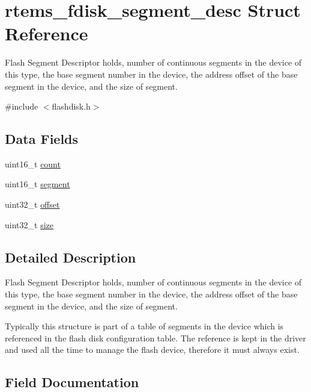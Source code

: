 \hypertarget{structrtems__fdisk__segment__desc}{}\section{rtems\+\_\+fdisk\+\_\+segment\+\_\+desc Struct Reference}
\label{structrtems__fdisk__segment__desc}


Flash Segment Descriptor holds, number of continuous segments in the device of this type, the base segment number in the device, the address offset of the base segment in the device, and the size of segment.  




{\ttfamily \#include $<$flashdisk.\+h$>$}

\subsection*{Data Fields}
\begin{DoxyCompactItemize}
\item 
uint16\+\_\+t \mbox{\hyperlink{structrtems__fdisk__segment__desc_af45cd5d67fcc57e6e44a6767b976b931}{count}}
\item 
uint16\+\_\+t \mbox{\hyperlink{structrtems__fdisk__segment__desc_a69898a46cb1e7b34ab1e11a53e352034}{segment}}
\item 
uint32\+\_\+t \mbox{\hyperlink{structrtems__fdisk__segment__desc_ac7c616a6fc4a48edb952ef57078b89bb}{offset}}
\item 
uint32\+\_\+t \mbox{\hyperlink{structrtems__fdisk__segment__desc_a04cde2011f4a662442909341c4768e47}{size}}
\end{DoxyCompactItemize}


\subsection{Detailed Description}
Flash Segment Descriptor holds, number of continuous segments in the device of this type, the base segment number in the device, the address offset of the base segment in the device, and the size of segment. 

Typically this structure is part of a table of segments in the device which is referenced in the flash disk configuration table. The reference is kept in the driver and used all the time to manage the flash device, therefore it must always exist. 

\subsection{Field Documentation}
\mbox{\label{structrtems__fdisk__segment__desc_af45cd5d67fcc57e6e44a6767b976b931}} 
